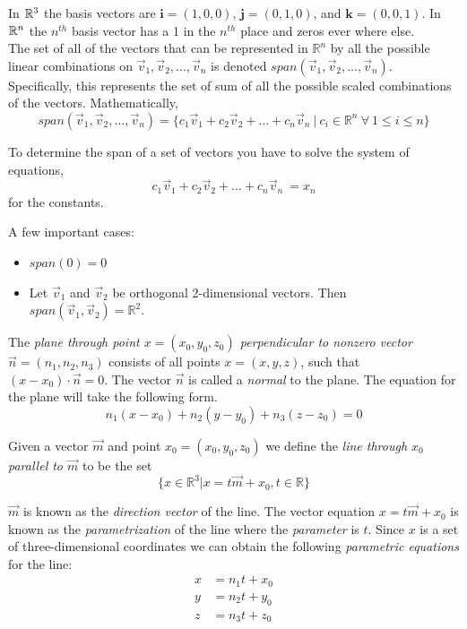 \documentclass[12pt]{article}
\begin{document}
In $\mathbb{R}^3$ the basis vectors are $\mathbf{i} = (1,0,0)$, $\mathbf{j} = (0,1,0)$, and $\mathbf{k} = (0,0,1)$. In $\mathbb{R}^n$ the $n^{th}$ basis vector has a 1 in the $n^{th}$ place and zeros ever where else. \\

The set of all of the vectors that can be represented in $\mathbb{R}^n$ by all the possible linear combinations on $\vec{v}_1,\vec{v}_2,\ldots,\vec{v}_n$ is denoted $span(\vec{v}_1,\vec{v}_2,\ldots,\vec{v}_n)$. Specifically, this represents the set of sum of all the possible scaled combinations of the vectors. Mathematically,
\[
span(\vec{v}_1,\vec{v}_2,\ldots,\vec{v}_n) = \{ c_1\vec{v}_1+c_2\vec{v}_2+\ldots+c_n\vec{v}_n\ |\ c_i \in \mathbb{R}^n\ \forall\ 1 \leq i \leq n \}
\]

To determine the span of a set of vectors you have to solve the system of equations,
\[
c_1\vec{v}_1+c_2\vec{v}_2+\ldots+c_n\vec{v}_n\ = x_n
\]
for the constants.

A few important cases:
\begin{itemize}
\item $span(0)=0$
\item Let $\vec{v}_1$ and $\vec{v}_2$ be orthogonal 2-dimensional vectors. Then $span(\vec{v}_1,\vec{v}_2)=\mathbb{R}^2$.\\
\end{itemize} 

The \emph{plane through point $x = (x_0,y_0,z_0)$ perpendicular to nonzero vector $\vec{n}=(n_1,n_2, n_3)$} consists of all points $x=(x,y,z)$, such that $(x-x_0)\cdot \vec{n} = 0$. The vector $\vec{n}$ is called a \emph{normal} to the plane.  The equation for the plane will take the following form.
\[
n_1(x-x_0)+n_2(y-y_0)+n_3(z-z_0)=0
\]

Given a vector $\vec{m}$ and point $x_0=(x_0,y_0,z_0)$ we define the \emph{line through $x_0$ parallel to $\vec{m}$} to be the set
\[
\{x\in\mathbb{R}^3|x=t\vec{m}+x_0, t\in\mathbb{R}\}
\]

$\vec{m}$ is known as the \emph{direction vector} of the line. The vector equation $x=t\vec{m}+x_0$ is known as the \emph{parametrization} of the line where the \emph{parameter} is $t$. Since $x$ is a set of three-dimensional coordinates we can obtain the following \emph{parametric equations} for the line:
\begin{align*}
x &= n_1t + x_0 \\
y &= n_2t + y_0 \\
z &= n_3t +z_0
\end{align*}
\end{document}
